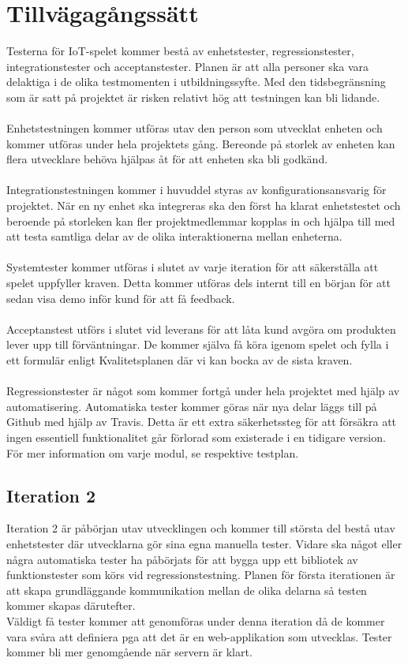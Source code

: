 \documentclass[10pt]{article}
\begin{document}
\section{Tillvägagångssätt}
	Testerna för IoT-spelet kommer bestå av enhetstester, regressionstester, integrationstester och acceptanstester. Planen är att alla personer ska vara delaktiga i de olika 		testmomenten i utbildningssyfte. Med den tidsbegränsning som är satt på projektet är risken relativt hög att testningen kan bli lidande. \\
	\\
	Enhetstestningen kommer utföras utav den person som utvecklat enheten och kommer utföras under hela projektets gång. Bereonde på storlek av enheten kan flera utvecklare behöva hjälpas åt för att enheten ska bli godkänd.\\
	\\
	Integrationstestningen kommer i huvuddel styras av konfigurationsansvarig för projektet. När en ny enhet ska integreras ska den först ha klarat enhetstestet och beroende på storleken kan fler projektmedlemmar kopplas in och hjälpa till med att testa samtliga delar av de olika interaktionerna mellan enheterna. \\
	\\
	Systemtester kommer utföras i slutet av varje iteration för att säkerställa att spelet uppfyller kraven. Detta kommer utföras dels internt till en början för att sedan visa demo inför kund för att få feedback.  \\ 
	\\
	Acceptanstest utförs i slutet vid leverans för att låta kund avgöra om produkten lever upp till förväntningar. De kommer själva få köra igenom spelet och fylla i ett formulär enligt Kvalitetsplanen där vi kan bocka av de sista kraven. \\
	\\
	Regressionstester är något som kommer fortgå under hela projektet med hjälp av automatisering. Automatiska tester kommer göras när nya delar läggs till på Github med hjälp av Travis. Detta är ett extra säkerhetssteg för att försäkra att ingen essentiell funktionalitet går förlorad som existerade i en tidigare version.\\
	För mer information om varje modul, se respektive testplan.
	
\subsection{Iteration 2}
	Iteration 2 är påbörjan utav utvecklingen och kommer till största del bestå utav enhetstester där utvecklarna gör sina egna manuella tester. Vidare ska något eller några automatiska tester ha påbörjats för att bygga upp ett bibliotek av funktionstester som körs vid regressionstestning. Planen för första iterationen är att skapa grundläggande kommunikation mellan de olika delarna så testen kommer skapas därutefter.
	\\
	Väldigt få tester kommer att genomföras under denna iteration då de kommer vara svåra att definiera pga att det är en web-applikation som utvecklas. Tester kommer bli mer genomgående när servern är klart.
	
\end{document}
